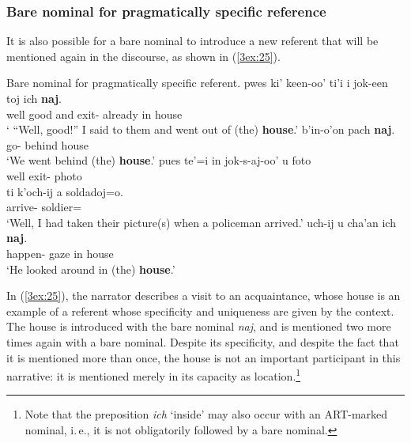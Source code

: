 \documentclass[output=paper]{langsci/langscibook}
\begin{document}
\subsubsection{Bare nominal for pragmatically specific reference}\label{3sec:335}

It is also possible for a bare nominal to introduce a new referent that will be mentioned again in the discourse, as shown in (\ref{3ex:25}).

\begin{samepage}
\begin{exe}
\ex\label{3ex:25}
Bare nominal for pragmatically specific referent. 
\exi{}
\gll	pwes 	ki'		keen-oo'			ti'i			i	jok-een		toj		ich	{\bf{naj}}. \\
	well		good		{}	{}	and	exit-{}	already	in	house \\
\glt	` ``Well, good!'' I said to them and went out of (the) {\bf{house}}.'
\exi{}
\gll	b'in-o'on 		pach 	{\bf{naj}}.  \\
	go-{}	behind	house \\
\glt	`We went behind (the) {\bf{house}}.'
\exi{}
\gll	pues te'=i					in 		jok-s-aj-oo'			u		foto \\
	well	{}	{} 	exit-{}	{}	photo \\
\glt
\exi{}
\gll	ti			k'och-ij				a	soldadoj=o. \\
	{}		arrive-{}	{}	soldier={} \\
\glt	`Well, I had taken their picture(s) when a policeman arrived.'
\exi{}
\gll	uch-ij 				u		cha'an	ich	{\bf{naj}}.  \\
	happen-{}	{}	gaze		in	house \\
\glt	`He looked around in (the) {\bf{house}}.'
\end{exe}
\end{samepage}

\filbreak
In (\ref{3ex:25}), the narrator describes a visit to an acquaintance, whose house is an example of a referent whose specificity and uniqueness are given by the context.  The house is introduced with the bare nominal {\emph{naj}}, and is mentioned two more times again with a bare nominal.  Despite its specificity, and despite the fact that it is mentioned more than once, the house is not an important participant in this narrative: it is mentioned merely in its capacity as location.\footnote{Note that the preposition {\emph{ich}} `inside' may also occur with an ART-marked nominal, i.\,e., it is not obligatorily followed by a bare nominal.}
\end{document}
